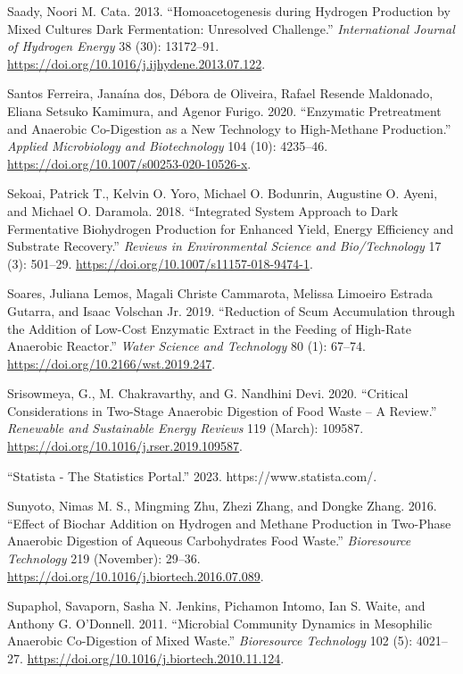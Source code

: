 \documentclass[11pt]{report}
\begin{document}
\begin{hangparas}{1.5em}{1}
\hypertarget{citeproc_bib_item_63}{Saady, Noori M. Cata. 2013. “Homoacetogenesis during Hydrogen Production by Mixed Cultures Dark Fermentation: Unresolved Challenge.” \textit{International Journal of Hydrogen Energy} 38 (30): 13172–91. \url{https://doi.org/10.1016/j.ijhydene.2013.07.122}.}

\hypertarget{citeproc_bib_item_64}{Santos Ferreira, Janaína dos, Débora de Oliveira, Rafael Resende Maldonado, Eliana Setsuko Kamimura, and Agenor Furigo. 2020. “Enzymatic Pretreatment and Anaerobic Co-Digestion as a New Technology to High-Methane Production.” \textit{Applied Microbiology and Biotechnology} 104 (10): 4235–46. \url{https://doi.org/10.1007/s00253-020-10526-x}.}

\hypertarget{citeproc_bib_item_65}{Sekoai, Patrick T., Kelvin O. Yoro, Michael O. Bodunrin, Augustine O. Ayeni, and Michael O. Daramola. 2018. “Integrated System Approach to Dark Fermentative Biohydrogen Production for Enhanced Yield, Energy Efficiency and Substrate Recovery.” \textit{Reviews in Environmental Science and Bio/Technology} 17 (3): 501–29. \url{https://doi.org/10.1007/s11157-018-9474-1}.}

\hypertarget{citeproc_bib_item_66}{Soares, Juliana Lemos, Magali Christe Cammarota, Melissa Limoeiro Estrada Gutarra, and Isaac Volschan Jr. 2019. “Reduction of Scum Accumulation through the Addition of Low-Cost Enzymatic Extract in the Feeding of High-Rate Anaerobic Reactor.” \textit{Water Science and Technology} 80 (1): 67–74. \url{https://doi.org/10.2166/wst.2019.247}.}

\hypertarget{citeproc_bib_item_67}{Srisowmeya, G., M. Chakravarthy, and G. Nandhini Devi. 2020. “Critical Considerations in Two-Stage Anaerobic Digestion of Food Waste – A Review.” \textit{Renewable and Sustainable Energy Reviews} 119 (March): 109587. \url{https://doi.org/10.1016/j.rser.2019.109587}.}

\hypertarget{citeproc_bib_item_68}{“Statista - The Statistics Portal.” 2023. https://www.statista.com/.}

\hypertarget{citeproc_bib_item_69}{Sunyoto, Nimas M. S., Mingming Zhu, Zhezi Zhang, and Dongke Zhang. 2016. “Effect of Biochar Addition on Hydrogen and Methane Production in Two-Phase Anaerobic Digestion of Aqueous Carbohydrates Food Waste.” \textit{Bioresource Technology} 219 (November): 29–36. \url{https://doi.org/10.1016/j.biortech.2016.07.089}.}

\hypertarget{citeproc_bib_item_70}{Supaphol, Savaporn, Sasha N. Jenkins, Pichamon Intomo, Ian S. Waite, and Anthony G. O’Donnell. 2011. “Microbial Community Dynamics in Mesophilic Anaerobic Co-Digestion of Mixed Waste.” \textit{Bioresource Technology} 102 (5): 4021–27. \url{https://doi.org/10.1016/j.biortech.2010.11.124}.}


\end{hangparas}
\end{document}
